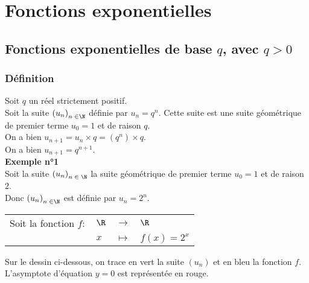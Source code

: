 \vspace*{-2cm}

\section{Fonctions exponentielles}

\subsection{Fonctions exponentielles de base $q$, avec $q > 0$}

\subsubsection{Définition}

Soit $q$ un réel strictement positif. \\
Soit la suite $\left(u_n\right)_{n\; \in \N}$ définie par $u_n = q^n$. Cette suite est une suite géométrique de premier terme $u_0 = 1$ et de raison $q$. \\

On a bien $u_{n+1} = u_n \times q = \left(q^n\right) \times q$. \\
On a bien $u_{n+1} = q^{n+1}$. \\

\textbf{Exemple n°1} \\

Soit la suite $\left(u_n\right)_{n\; \in \; \N}$ la suite géométrique de premier terme $u_0 = 1$ et de raison $2$.\\ Donc $\left(u_n\right)_{n \; \in \N}$ est définie par $u_n = 2^n$. \\

\begin{tabular}{llll}
\hspace*{-.3cm} Soit la fonction $f:$ & $\R$ & $\longrightarrow$ & $\R$ \\
& $x$ & $\longmapsto$ & $f(x) = 2^x$ \\
\end{tabular}

\vspace*{.3cm}

Sur le dessin ci-dessous, on trace en vert la suite $\left(u_n\right)$ et en bleu la fonction $f$. \\
L'asymptote d'équation $y = 0$ est représentée en rouge. \\

